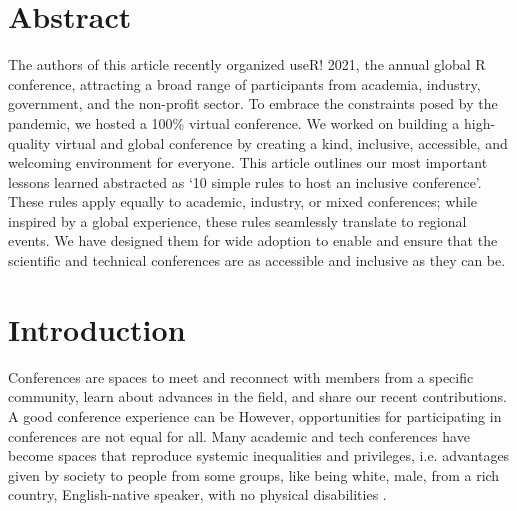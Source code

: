 \documentclass[10pt,letterpaper]{article}
\begin{document}
\section*{Abstract}

The authors of this article recently organized useR! 2021, the annual global R conference, attracting a broad range of participants from academia, industry, government, and the non-profit sector. To embrace the constraints posed by the pandemic, we hosted a 100\% virtual conference. We worked on building a high-quality virtual and global conference by creating a kind, inclusive, accessible, and welcoming environment for everyone. 
This article outlines our most important lessons learned abstracted as `10 simple rules to host an inclusive conference'. These rules apply equally to academic, industry, or mixed conferences; while inspired by a global experience, these rules seamlessly translate to regional events. 
We have designed them for wide adoption to enable and ensure that the scientific and technical conferences are as accessible and inclusive as they can be. 
 


\linenumbers

\section*{Introduction}

Conferences are spaces to meet and reconnect with members from a specific community, learn about advances in the field, and share our recent contributions.
A good conference experience can be 
However, opportunities for participating in conferences are not equal for all. 
Many academic and tech conferences have become spaces that reproduce systemic inequalities and privileges, i.e. advantages given by society to people from some groups, like being white, male, from a rich country, English-native speaker, with no physical disabilities \cite{arendDisparityConferenceRegistration2019, biggsAcademicConferenceChilly2018, depickerRethinkingInclusionDisability2020a, irishIncreasingParticipationUsing2020}.
\end{document}
